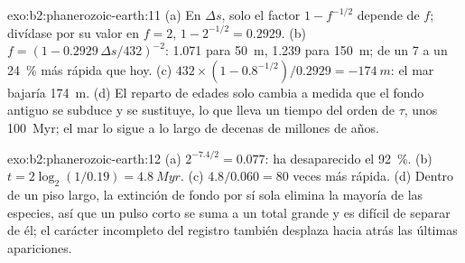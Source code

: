 \begin{solution}{exo:b2:phanerozoic-earth:11}
(a) En $\Delta s$, solo el factor $1 - f^{-1/2}$ depende de $f$; divídase por su valor en $f = 2$,
$1 - 2^{-1/2} = 0.2929$. (b) $f = (1 - 0.2929\,\Delta s/432)^{-2}$: 1.071 para \qty{50}{m}, 1.239
para \qty{150}{m}; de un 7 a un \qty{24}{\percent} más rápida que hoy. (c) $432 \times (1 -
0.8^{-1/2})/0.2929 = \qty{-174}{m}$: el mar bajaría \qty{174}{m}. (d) El reparto de edades
solo cambia a medida que el fondo antiguo se subduce y se sustituye, lo que lleva un tiempo del orden de $\tau$,
unos \qty{100}{Myr}; el mar lo sigue a lo largo de decenas de millones de años.
\end{solution}

\begin{solution}{exo:b2:phanerozoic-earth:12}
(a) $2^{-7.4/2} = 0.077$: ha desaparecido el \qty{92}{\percent}. (b) $t = 2\log_2(1/0.19) = \qty{4.8}{Myr}$.
(c) $4.8/0.060 = 80$ veces más rápida. (d) Dentro de un piso largo, la extinción de fondo por sí sola elimina
la mayoría de las especies, así que un pulso corto se suma a un total grande y es difícil de separar de él; el
carácter incompleto del registro también desplaza hacia atrás las últimas apariciones.
\end{solution}

